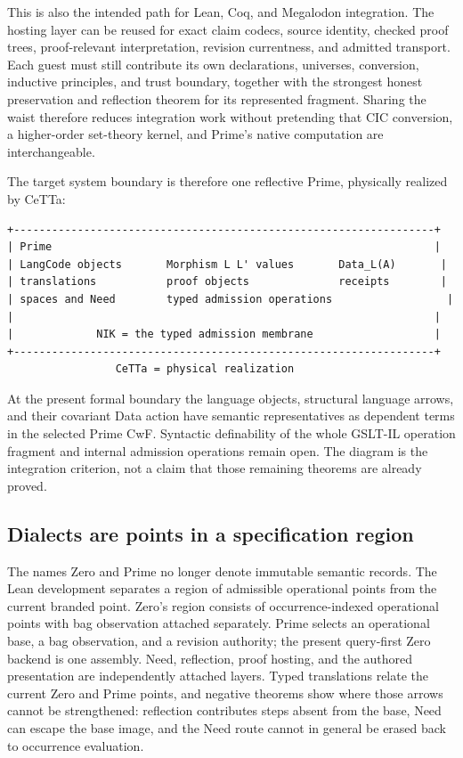 \documentclass[11pt]{article}
\newcommand{\CeTTa}{CeTTa}
\begin{document}
This is also the intended path for Lean, Coq, and Megalodon integration.  The
hosting layer can be reused for exact claim codecs, source identity, checked
proof trees, proof-relevant interpretation, revision currentness, and admitted
transport.  Each guest must still contribute its own declarations, universes,
conversion, inductive principles, and trust boundary, together with the
strongest honest preservation and reflection theorem for its represented
fragment.  Sharing the waist therefore reduces integration work without
pretending that CIC conversion, a higher-order set-theory kernel, and Prime's
native computation are interchangeable.

The target system boundary is therefore one reflective Prime, physically realized
by \CeTTa{}:

\begin{lstlisting}
+------------------------------------------------------------------+
| Prime                                                            |
| LangCode objects       Morphism L L' values       Data_L(A)       |
| translations           proof objects              receipts        |
| spaces and Need        typed admission operations                  |
|                                                                  |
|             NIK = the typed admission membrane                   |
+------------------------------------------------------------------+
                 CeTTa = physical realization
\end{lstlisting}

At the present formal boundary the language objects, structural language arrows,
and their covariant Data action have semantic representatives as dependent terms
in the selected Prime CwF.  Syntactic definability of the whole GSLT-IL operation
fragment and internal admission operations remain open.  The diagram is the
integration criterion, not a claim that those remaining theorems are already
proved.

\subsection{Dialects are points in a specification region}

The names Zero and Prime no longer denote immutable semantic records.  The Lean
development separates a region of admissible operational points from the current
branded point.  Zero's region consists of occurrence-indexed operational points
with bag observation attached separately.  Prime selects an operational base, a
bag observation, and a revision authority; the present query-first Zero backend is
one assembly.  Need, reflection, proof hosting, and the authored presentation are
independently attached layers.  Typed translations relate the current Zero and
Prime points, and negative theorems show where those arrows cannot be strengthened:
reflection contributes steps absent from the base, Need can escape the base image,
and the Need route cannot in general be erased back to occurrence evaluation.
\end{document}
